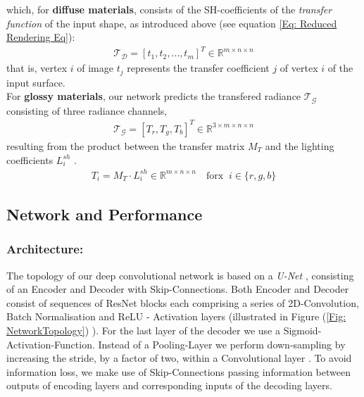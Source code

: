 which, for \textbf{diffuse materials}, consists of the SH-coefficients of the \textit{transfer function} of the input shape, as introduced above (see equation \ref{Eq: Reduced Rendering Eq}):
\begin{align*}
	\mathcal{T_D} = [ t_1, t_2, \dots, t_m ]^T \in \mathbb{R}^{m \times n \times n} 
\end{align*}
that is, vertex $i$ of image $t_j$ represents the transfer coefficient $j$ of vertex $i$ of the input surface.
\\
For \textbf{glossy materials}, our network predicts the transfered radiance $\mathcal{T_G}$ consisting of three radiance channels, 
\begin{align*}
\mathcal{T_G} = [T_r , T_g ,T_b]^T \in \mathbb{R}^{3 \times m \times n \times n} 
\end{align*}
resulting from the product between the transfer matrix $M_T$ and the lighting coefficients  $ L^{sh}_i$ \cite{sloan2002precomputed}. 
\begin{align*}
T_i= M_T \cdot L^{sh}_i   \in \mathbb{R}^{m \times n \times n}   \quad \text{forx }~  i \in \{r,g,b\} 
\end{align*}
\subsection{Network and Performance }
\subsubsection*{Architecture: \\} 
The topology of our deep convolutional network is based on a \textit{U-Net}  \cite{U-Net}, consisting of an Encoder and Decoder with Skip-Connections. Both Encoder and Decoder consist of sequences of ResNet blocks \cite{ResNet} each comprising a series of 2D-Convolution, Batch Normalisation and ReLU - Activation layers (illustrated in Figure (\ref{Fig: NetworkTopology}) ). For the last layer of the decoder we use a Sigmoid-Activation-Function. Instead of a Pooling-Layer we perform down-sampling by increasing the stride, by a factor of two, within a Convolutional layer \cite{StridingConv}. To avoid information loss,  we make use of Skip-Connections passing information between outputs of encoding layers and corresponding inputs of the decoding layers. 

